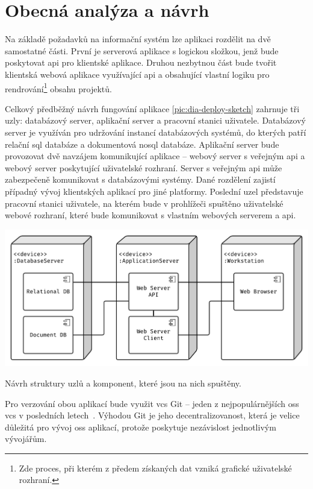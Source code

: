 \chapter{Obecná analýza a návrh}

Na základě požadavků na informační systém lze aplikaci rozdělit na dvě samostatné části. První je serverová aplikace s logickou složkou, jenž bude poskytovat \gls{api} pro klientské aplikace. Druhou nezbytnou část bude tvořit klientská webová aplikace využívající \gls{api} a obsahující vlastní logiku pro rendrování\footnote{Zde proces, při kterém z předem získaných dat vzniká grafické uživatelské rozhraní.} obsahu projektů.

Celkový předběžný návrh fungování aplikace \ref{pic:dia-deploy-sketch} zahrnuje tři uzly: databázový server, aplikační server a pracovní stanici uživatele. Databázový server je využíván pro udržování instancí databázových systémů, do kterých patří relační \gls{sql} databáze a dokumentová \gls{nosql} databáze. Aplikační server bude provozovat dvě navzájem komunikující aplikace -- webový server s veřejným \gls{api} a webový server poskytující uživatelské rozhraní. Server s veřejným \gls{api} může zabezpečeně komunikovat s databázovými systémy. Dané rozdělení zajistí případný vývoj klientských aplikací pro jiné platformy. Poslední uzel představuje pracovní stanici uživatele, na kterém bude v prohlížeči spuštěno uživatelské webové rozhraní, které bude komunikovat s vlastním webových serverem a \gls{api}.

\begin{fig:illustration}
   \includegraphics[width=1\textwidth]{images/dia-deploy-sketch.pdf}
   \caption{Návrh struktury uzlů a komponent, které jsou na nich spuštěny.}\label{pic:dia-deploy-sketch}
\end{fig:illustration}

Pro verzování obou aplikací bude využit \gls{vcs} Git -- jeden z nejpopulárnějších \gls{oss} \gls{vcs} v posledních letech~\cite{vcsG2}. Výhodou Git je jeho decentralizovanost, která je velice důležitá pro vývoj \gls{oss} aplikací, protože poskytuje nezávislost jednotlivým vývojářům.


